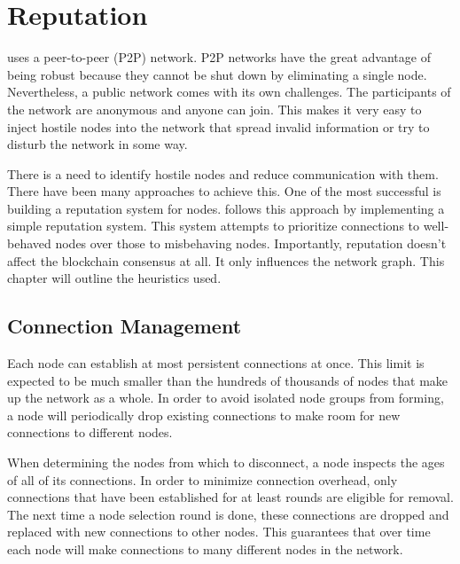 \section{Reputation}
\label{sec:reputation}


\codenamechapterfirstword uses a peer-to-peer (P2P) network.
P2P networks have the great advantage of being robust because they cannot be shut down by eliminating a single node.
Nevertheless, a public network comes with its own challenges.
The participants of the network are anonymous and anyone can join.
This makes it very easy to inject hostile nodes into the network that spread invalid information or try to disturb the network in some way.

There is a need to identify hostile nodes and reduce communication with them.
There have been many approaches to achieve this.
One of the most successful is building a reputation system for nodes.
\codenamespace follows this approach by implementing a simple reputation system.
This system attempts to prioritize connections to well-behaved nodes over those to misbehaving nodes.
Importantly, reputation doesn't affect the blockchain consensus at all.
It only influences the network graph.
This chapter will outline the heuristics used.

\subsection{Connection Management}
\label{sec:reputation:ConnectionManagement}

Each node can establish at most  persistent connections at once.
This limit is expected to be much smaller than the hundreds of thousands of nodes that make up the network as a whole.
In order to avoid isolated node groups from forming, a node will periodically drop existing connections to make room for new connections to different nodes.

When determining the nodes from which to disconnect, a node inspects the ages of all of its connections.
In order to minimize connection overhead, only connections that have been established for at least  rounds are eligible for removal.
The next time a node selection round is done, these connections are dropped and replaced with new connections to other nodes.
This guarantees that over time each node will make connections to many different nodes in the network.

